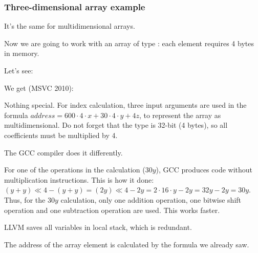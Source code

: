 \subsubsection{Three-dimensional array example}

It's the same for multidimensional arrays.

Now we are going to work with an array of type \Tint: each element requires 4 bytes in memory.

Let's see:




We get (MSVC 2010):



Nothing special. For index calculation, three input arguments are used 
in the formula $address=600 \cdot 4 \cdot x + 30 \cdot 4 \cdot y + 4z$, to represent the array as multidimensional.
Do not forget that the \Tint type is 32-bit (4 bytes),
so all coefficients must be multiplied by 4.



The GCC compiler does it differently.

For one of the operations in the calculation ($30y$), GCC produces code without multiplication instructions.
This is how it done: 
$(y+y) \ll 4 - (y+y) = (2y) \ll 4 - 2y = 2 \cdot 16 \cdot y - 2y = 32y - 2y = 30y$. 
Thus, for the $30y$ calculation, only one addition operation,
one bitwise shift operation and one subtraction operation are used.
This works faster.




\NonOptimizing LLVM saves all variables in local stack, which is redundant.

The address of the array element is calculated by the formula we already saw.




